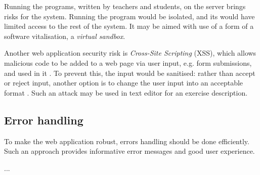         Running the programs, written by teachers and students, on the server brings risks for the system. Running the program would be isolated, and its would have limited access to the rest of the system. It may be aimed with use of a form of a software vitalisation, a \textit{virtual sandbox}.
        
        Another web application security risk is \textit{Cross-Site Scripting} (XSS), which allows malicious code to be added to a web page via user input, e.g. form submissions, and used in it \cite[A7-Cross-Site Scripting (XSS)]{owasp_xss}. To prevent this, the input would be sanitised: rather than accept or reject input, another option is to change the user input into an acceptable format \cite[Sanitize]{owasp_sanitize}. Such an attack may be used in text editor for an exercise description.
        
        \subsection{Error handling}
        To make the web application robust, errors handling should be done efficiently. Such an approach provides informative error messages and good user experience.
        
        ...
